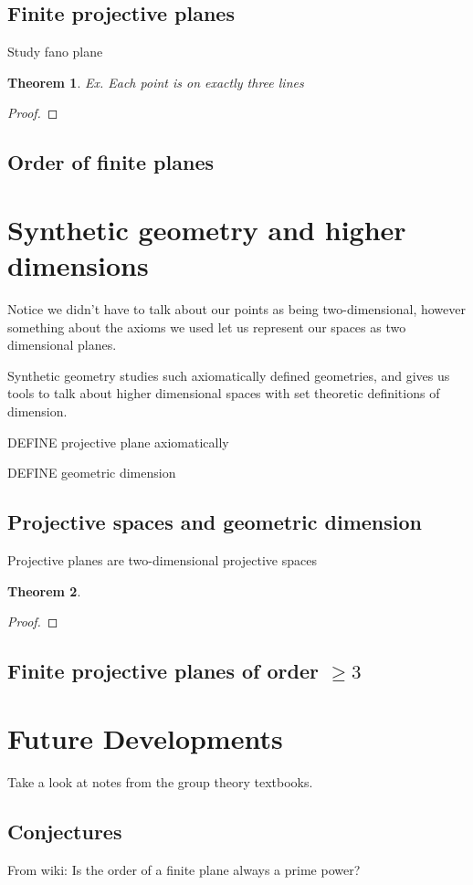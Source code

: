 \documentclass[12pt]{article}
\newtheorem{theorem}{Theorem}
\begin{document}
    \subsection{Finite projective planes}

    Study fano plane

    \begin{theorem}
        Ex. Each point is on exactly three lines
    \end{theorem}

    \begin{proof}

    \end{proof}


    \subsection{Order of finite planes}

    \section{Synthetic geometry and higher dimensions}

    Notice we didn't have to talk about our points as being two-dimensional,
    however something about the axioms we used let us represent our spaces as two dimensional planes.

    Synthetic geometry studies such axiomatically defined geometries, and gives us tools to talk about
    higher dimensional spaces with set theoretic definitions of dimension.

    DEFINE projective plane axiomatically

    DEFINE geometric dimension

    \subsection{Projective spaces and geometric dimension}

    Projective planes are two-dimensional projective spaces

    \begin{theorem}
    \end{theorem}

    \begin{proof}
    \end{proof}

    \subsection{Finite projective planes of order $\geq 3$ }

    \section{Future Developments}

    Take a look at notes from the group theory textbooks.

    \subsection{Conjectures}

    From wiki: Is the order of a finite plane always a prime power?

    
    
\end{document}
